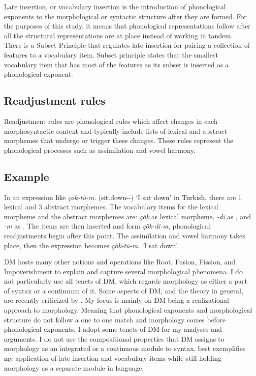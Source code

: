 Late insertion, or vocabulary insertion is the introduction of phonological exponents to the morphological or syntactic structure after they are formed. For the purposes of this study, it means that phonological representations follow after all the structural representations are at place instead of working in tandem. There is a Subset Principle \citep{halle2000distributed} that regulates late insertion for pairing a collection of features to a vocabulary item. Subset principle states that the smallest vocabulary item that has most of the features as its subset is inserted as a phonological exponent. 

\subsection{Readjustment rules}

Readjustment rules are phonological rules which affect changes in each morphosyntactic context and typically include lists of lexical and abstract morphemes that undergo or trigger these changes. These rules represent the phonological processes such as assimilation and vowel harmony.


\subsection{Example}

In an expression like \textit{çök-tü-m.} (sit.down-{\Pst}-{\Fsg}) `I sat down' in Turkish, there are 1 lexical and 3 abstract morphemes. The vocabulary items for the lexical morpheme and the abstract morphemes are: \textit{çök} as lexical morpheme, \textit{-di} as {\Pst}, and \textit{-m} as {\Fsg}. The items are then inserted and form \textit{çök-di-m}, phonological readjustments begin after this point. The assimilation and vowel harmony takes place, then the expression becomes \textit{çök-tü-m.} `I sat down'. 

DM hosts many other notions and operations like Root, Fusion, Fission, and Impoverishment \citep{halle2000distributed,bonet1991morphology, embick2015morpheme} to explain and capture several morphological phenomena. I do not particularly use all tenets of DM, which regards morphology as either a part of syntax or a continuum of it. Some aspects of DM, and the theory in general, are recently criticized by \citet{spencer2019manufacturing}. My focus is mainly on DM being a realizational approach to morphology. Meaning that phonological exponents and morphological structure do not follow a one to one match and morphology comes before phonological exponents. I adopt some tenets of DM for my analyses and arguments. I do not use the compositional properties that DM assigns to morphology as an integrated or a continuous module to syntax. \citet{ackema2007morphology} best exemplifies my application of late insertion and vocabulary items while still holding morphology as a separate module in language.